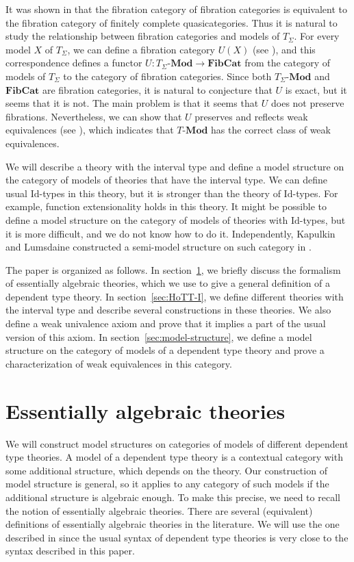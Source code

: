 \documentclass{mscs}
\newcommand{\IdT}{\mathrm{Id}}
\newcommand{\cat}[1]{\mathbf{#1}}
\newcommand{\Mod}[1]{#1\text{-}\cat{Mod}}
\numberwithin{figure}{section}
\begin{document}
It was shown in \cite{szumilo} that the fibration category of fibration categories is equivalent to the fibration category of finitely complete quasicategories.
Thus it is natural to study the relationship between fibration categories and models of $T_\Sigma$.
For every model $X$ of $T_\Sigma$, we can define a fibration category $U(X)$ (see \cite{tt-fibr-cat}), and this correspondence defines a functor $U : \Mod{T_\Sigma} \to \cat{FibCat}$
from the category of models of $T_\Sigma$ to the category of fibration categories.
Since both $\Mod{T_\Sigma}$ and $\cat{FibCat}$ are fibration categories, it is natural to conjecture that $U$ is exact, but it seems that it is not.
The main problem is that it seems that $U$ does not preserve fibrations.
Nevertheless, we can show that $U$ preserves and reflects weak equivalences (see ), which indicates that $\Mod{T}$ has the correct class of weak equivalences.

We will describe a theory with the interval type and define a model structure on the category of models of theories that have the interval type.
We can define usual $\IdT$-types in this theory, but it is stronger than the theory of $\IdT$-types.
For example, function extensionality holds in this theory.
It might be possible to define a model structure on the category of models of theories with $\IdT$-types,
but it is more difficult, and we do not know how to do it.
Independently, Kapulkin and Lumsdaine constructed a semi-model structure on such category in \cite{kap-lum-model}.

The paper is organized as follows.
In section~\ref{sec:alg-th}, we briefly discuss the formalism of essentially algebraic theories, which we use to give a general definition of a dependent type theory.
In section~\ref{sec:HoTT-I}, we define different theories with the interval type and describe several constructions in these theories.
We also define a weak univalence axiom and prove that it implies a part of the usual version of this axiom.
In section~\ref{sec:model-structure}, we define a model structure on the category of models of a dependent type theory
and prove a characterization of weak equivalences in this category.

\section{Essentially algebraic theories}
\label{sec:alg-th}

We will construct model structures on categories of models of different dependent type theories.
A model of a dependent type theory is a contextual category with some additional structure, which depends on the theory.
Our construction of model structure is general, so it applies to any category of such models if the additional structure is algebraic enough.
To make this precise, we need to recall the notion of essentially algebraic theories.
There are several (equivalent) definitions of essentially algebraic theories in the literature.
We will use the one described in \cite{PHL} since the usual syntax of dependent type theories is very close to the syntax described in this paper.
\end{document}
